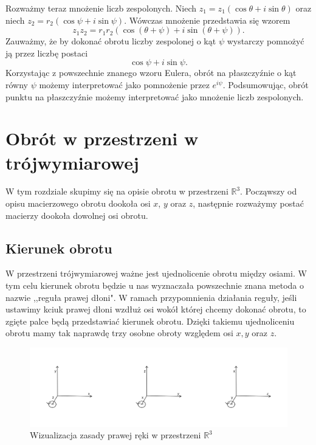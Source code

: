 \documentclass[a4paper,twoside,11pt,reqno]{mwrep}
\theoremstyle{plain} \newtheorem{twr}{Twierdzenie}
\theoremstyle{plain} \newtheorem{lem}{Lemat}
\theoremstyle{definition} \newtheorem{defi}{Definicja}
\theoremstyle{remark} \newtheorem*{wni}{Wniosek}
\theoremstyle{definition} \newtheorem{uwaga}{Uwaga}
\theoremstyle{definition}\newtheorem{prz}{Przykład}
\begin{document}
Rozważmy teraz mnożenie liczb zespolonych. Niech $z_1 = z_1(\cos\theta +i\sin\theta)$ oraz 
niech $z_2 = r_2(\cos\psi +i\sin\psi)$.
Wówczas mnożenie przedstawia się wzorem
$$z_1z_2=r_1r_2(\cos(\theta+\psi) +i\sin(\theta+\psi)).$$
Zauważmy, że by dokonać obrotu liczby zespolonej o kąt $\psi$ 
wystarczy pomnożyć ją przez liczbę postaci $$\cos\psi +i\sin\psi.$$
Korzystając z powszechnie znanego wzoru Eulera, obrót na płaszczyźnie
o kąt równy $\psi$ możemy interpretować jako pomnożenie przez $e^{i\psi}$.
Podsumowując, obrót punktu na płaszczyźnie możemy interpretować jako mnożenie liczb zespolonych.

\section{Obrót w przestrzeni w trójwymiarowej}

W tym rozdziale skupimy się na opisie obrotu w
przestrzeni $\mathbb{R}^3$. 
Począwszy od opisu macierzowego obrotu dookoła osi $x$, $y$ oraz $z$, następnie
rozważymy postać macierzy dookoła dowolnej osi obrotu.

\subsection{Kierunek obrotu}

W przestrzeni trójwymiarowej ważne jest ujednolicenie obrotu między osiami.
W tym celu kierunek obrotu będzie u nas wyznaczała powszechnie znana metoda
o nazwie ,,reguła prawej dłoni". W ramach przypomnienia działania reguły, jeśli ustawimy
kciuk prawej dłoni wzdłuż osi wokół której chcemy
dokonać obrotu, to zgięte palce będą przedstawiać kierunek obrotu.
Dzięki takiemu ujednoliceniu obrotu mamy tak naprawdę trzy osobne obroty względem osi $x,y$
oraz $z$.

\begin{figure}[h]
\begin{center}
\includegraphics[width=15 cm]{zasPrawejReki.png}
\caption{Wizualizacja zasady prawej ręki w przestrzeni $\mathbb{R}^3$}
\end{center}
\end{figure}
\end{document}
